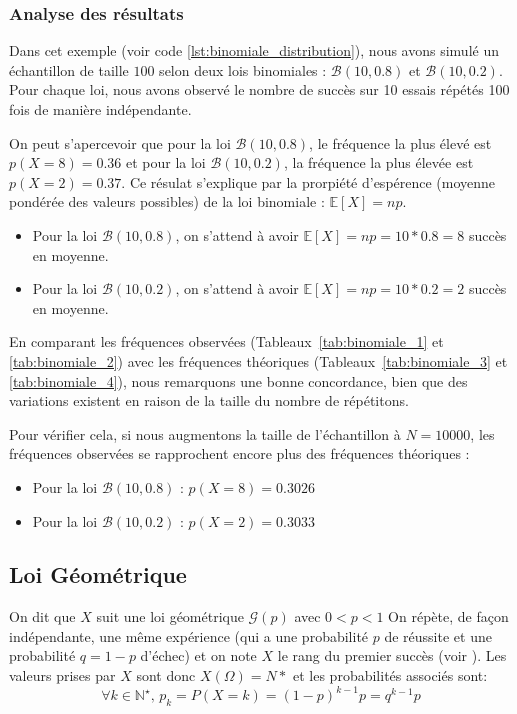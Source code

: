     \subsubsection{Analyse des résultats}
    Dans cet exemple (voir code \ref{lst:binomiale_distribution}), nous avons simulé un échantillon de taille $100$ selon deux lois binomiales : $\mathcal B(10,0.8)$ et $\mathcal B(10,0.2)$. Pour chaque loi, nous avons observé le nombre de succès sur 10 essais répétés 100 fois de manière indépendante.
    
    On peut s'apercevoir que pour la loi $\mathcal B(10,0.8)$, le fréquence la plus élevé est $p(X=8)=0.36$ et pour la loi $\mathcal B(10,0.2)$, la fréquence la plus élevée est $p(X=2)=0.37$. 
    Ce résulat s'explique par la prorpiété d'espérence (moyenne pondérée des valeurs possibles) de la loi binomiale : $\mathbb E[X]=np$.
    \begin{itemize}
      \item Pour la loi $\mathcal B(10,0.8)$, on s'attend à avoir $\mathbb E[X]=np=10*0.8=8$ succès en moyenne.
      \item Pour la loi $\mathcal B(10,0.2)$, on s'attend à avoir $\mathbb E[X]=np=10*0.2=2$ succès en moyenne.
    \end{itemize}

    En comparant les fréquences observées (Tableaux~\ref{tab:binomiale_1} et \ref{tab:binomiale_2}) avec les fréquences théoriques (Tableaux~\ref{tab:binomiale_3} et \ref{tab:binomiale_4}), nous remarquons une bonne concordance, bien que des variations existent en raison de la taille du nombre de répétitons.

    Pour vérifier cela, si nous augmentons la taille de l'échantillon à $N=10000$, les fréquences observées se rapprochent encore plus des fréquences théoriques :
    \begin{itemize}
      \item Pour la loi $\mathcal B(10,0.8)$ : $p(X=8)=0.3026$
      \item Pour la loi $\mathcal B(10,0.2)$ : $p(X=2)=0.3033$
    \end{itemize}


    \subsection{Loi Géométrique}  
      On dit que $X$ suit une loi géométrique $\mathcal G(p)$ avec $ 0 < p < 1$
      On répète, de façon indépendante, une même expérience (qui a une probabilité $p$ de réussite et une probabilité $q=1-p$ d’échec) et on note $X$ le rang du premier succès (voir \cite{geometriclaw}).
      Les valeurs prises par $X$ sont donc $X(\Omega) = N*$ et les probabilités associés sont:
      \begin{equation}
        \forall k\in\mathbb N^\star,\, p_k=P(X=k) = (1-p)^{k-1}p = q^{k-1}p
        \label{eq:loi_geometrique}
      \end{equation}

